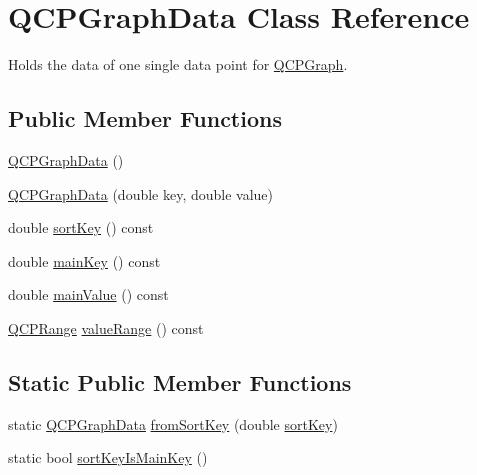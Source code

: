 \hypertarget{class_q_c_p_graph_data}{}\section{Q\+C\+P\+Graph\+Data Class Reference}
\label{class_q_c_p_graph_data}


Holds the data of one single data point for \mbox{\hyperlink{class_q_c_p_graph}{Q\+C\+P\+Graph}}.  


\subsection*{Public Member Functions}
\begin{DoxyCompactItemize}
\item 
\mbox{\hyperlink{class_q_c_p_graph_data_ac43f7499383d2fa2ffb7a4ad43f76c7c}{Q\+C\+P\+Graph\+Data}} ()
\item 
\mbox{\hyperlink{class_q_c_p_graph_data_a2c32177f12f902f4e05f712837082bd6}{Q\+C\+P\+Graph\+Data}} (double key, double value)
\item 
double \mbox{\hyperlink{class_q_c_p_graph_data_a5e0f37ea101eeec245d8c32a2206b204}{sort\+Key}} () const
\item 
double \mbox{\hyperlink{class_q_c_p_graph_data_a72fdaf738f679ef93bea3d552ba42d1b}{main\+Key}} () const
\item 
double \mbox{\hyperlink{class_q_c_p_graph_data_a1b1e440a430a4a83d9a3f6f247510f27}{main\+Value}} () const
\item 
\mbox{\hyperlink{class_q_c_p_range}{Q\+C\+P\+Range}} \mbox{\hyperlink{class_q_c_p_graph_data_a2f8dd30360356f66cc418a170a9f3792}{value\+Range}} () const
\end{DoxyCompactItemize}
\subsection*{Static Public Member Functions}
\begin{DoxyCompactItemize}
\item 
static \mbox{\hyperlink{class_q_c_p_graph_data}{Q\+C\+P\+Graph\+Data}} \mbox{\hyperlink{class_q_c_p_graph_data_a4646eac7f7a48970ea0fc5153aab0e77}{from\+Sort\+Key}} (double \mbox{\hyperlink{class_q_c_p_graph_data_a5e0f37ea101eeec245d8c32a2206b204}{sort\+Key}})
\item 
static bool \mbox{\hyperlink{class_q_c_p_graph_data_a1c98dfd21b82321a173db4ff860dfd21}{sort\+Key\+Is\+Main\+Key}} ()
\end{DoxyCompactItemize}

